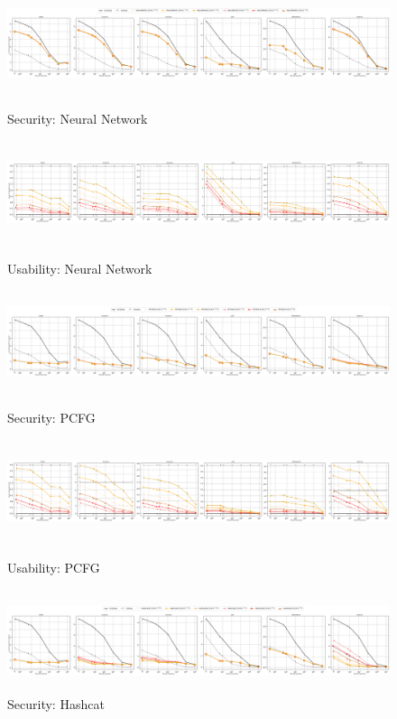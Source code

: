 \begin{figure}

	\includegraphics[width=\linewidth, height = 3cm]{Figures/Experiments/Attacker/SecurityNeuralNet}
	\vspace{-0.2in}
	\caption[Security: Neural Network Estimator]{Security: Neural Network}
	\label{fig:securityneuralnet}
	\includegraphics[width=\linewidth, height = 3cm]{Figures/Experiments/Utility/UsabilityNeuralNet}
	\vspace{-0.2in}
	\caption[Usability: Neural Network Estimator]{Usability: Neural Network}
	\label{fig:usabilityneuralnet}
	\includegraphics[width=\linewidth, height = 3cm]{Figures/Experiments/Attacker/SecurityPCFG}
   \vspace{-0.2in}
\caption[Security: PCFG Estimator]{Security: PCFG}
	\label{fig:securitypcfg}
\includegraphics[width=\linewidth, height = 3cm]{Figures/Experiments/Utility/UsabilityPCFG}
\vspace{-0.2in}
	\caption[Usability: PCFG Estimator]{Usability: PCFG}
\label{fig:usabilitypcfg}
		\includegraphics[width=\linewidth, height = 3cm]{Figures/Experiments/Attacker/SecurityHashcat}
		\vspace{-0.2in}
		\caption[Security: Hashcat Estimator]{Security: Hashcat}
		\label{fig:securityhashcat}
	

\end{figure}
